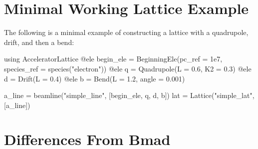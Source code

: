 \section{Minimal Working Lattice Example}
\label{s:min.lat}

The following is a minimal example of constructing a lattice with a quadrupole, drift, and then
a bend:
\begin{example}
  using AcceleratorLattice
  @ele begin_ele = BeginningEle(pc_ref = 1e7, species_ref = species("electron"))
  @ele q = Quadrupole(L = 0.6, K2 = 0.3)
  @ele d = Drift(L = 0.4)
  @ele b = Bend(L = 1.2, angle = 0.001)

  a_line = beamline("simple_line", [begin_ele, q, d, b])
  lat = Lattice("simple_lat", [a_line])
\end{example}

\section{Differences From Bmad}

